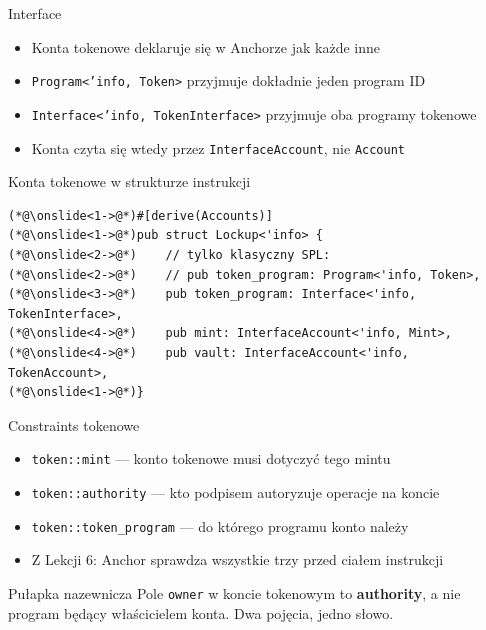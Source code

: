 \begin{frame}[fragile]{Interface}
  \begin{itemize}
    \item Konta tokenowe deklaruje się w Anchorze jak każde inne
    \item \texttt{Program<'info, Token>} przyjmuje dokładnie jeden program ID
    \item \texttt{Interface<'info, TokenInterface>} przyjmuje oba programy tokenowe
    \item Konta czyta się wtedy przez \texttt{InterfaceAccount}, nie \texttt{Account}
  \end{itemize}
  \begin{codeblock}{Konta tokenowe w strukturze instrukcji}
\begin{lstlisting}[style=reveal]
(*@\onslide<1->@*)#[derive(Accounts)]
(*@\onslide<1->@*)pub struct Lockup<'info> {
(*@\onslide<2->@*)    // tylko klasyczny SPL:
(*@\onslide<2->@*)    // pub token_program: Program<'info, Token>,
(*@\onslide<3->@*)    pub token_program: Interface<'info, TokenInterface>,
(*@\onslide<4->@*)    pub mint: InterfaceAccount<'info, Mint>,
(*@\onslide<4->@*)    pub vault: InterfaceAccount<'info, TokenAccount>,
(*@\onslide<1->@*)}
\end{lstlisting}
  \end{codeblock}
\end{frame}

\begin{frame}[fragile]{Constraints tokenowe}
  \begin{itemize}
    \item \texttt{token::mint} --- konto tokenowe musi dotyczyć tego mintu
    \item \texttt{token::authority} --- kto podpisem autoryzuje operacje na koncie
    \item \texttt{token::token\_program} --- do którego programu konto należy
    \item Z Lekcji 6: Anchor sprawdza wszystkie trzy przed ciałem instrukcji
  \end{itemize}
  \vspace{0.15cm}
  \begin{alertblock}{Pułapka nazewnicza}
    Pole \texttt{owner} w koncie tokenowym to \textbf{authority}, a nie
    program będący właścicielem konta. Dwa pojęcia, jedno słowo.
  \end{alertblock}
\end{frame}

